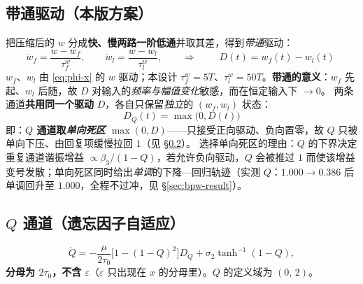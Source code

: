 \documentclass[11pt,a4paper]{article}
\theoremstyle{remark}\newtheorem{remark}{注}
\newcommand{\ath}{\operatorname{tanh}^{-1}}
\begin{document}
\subsection{带通驱动（本版方案）}\label{sec:bpw}
把压缩后的 $w$ 分成\textbf{快、慢两路一阶低通}并取其差，得到\emph{带通}驱动：
\begin{equation}
  \dot w_f=\frac{w-w_f}{\tau_f^{w}},\qquad \dot w_l=\frac{w-w_l}{\tau_l^{w}},
  \qquad\Longrightarrow\qquad
  \boxed{\;D(t)=w_f(t)-w_l(t)\;}
  \label{eq:bpw}
\end{equation}
$w_f$、$w_l$ 由 \eqref{eq:phi-x} 的 $w$ 驱动；本设计 $\tau_f^{w}=5T$、$\tau_l^{w}=50T$。\textbf{带通的意义}：$w_f$ 先起、$w_l$ 后随，故 $D$ 对输入的\emph{频率与幅值变化}敏感，而在恒定输入下 $\to0$。
两条通道\textbf{共用同一个驱动} $D$，各自只保留\emph{独立}的 $(w_f,w_l)$ 状态：
\begin{equation}
  \boxed{\;D_Q(t)=\max\bigl(0, D(t)\bigr)\;}
  \label{eq:shared-D}
\end{equation}
即：\textbf{$Q$ 通道取\emph{单向死区} $\max(0,D)$}——只接受正向驱动、负向置零，故 $Q$ 只被单向下压、由回复项缓慢拉回 $1$（见 \S\ref{sec:qch}）。
选择单向死区的理由：$Q$ 的下界决定重复通道谐振增益 $\propto\beta_3/(1-Q)$，若允许负向驱动，$Q$ 会被推过 $1$ 而使该增益变号发散；单向死区同时给出\emph{单调}的下降—回归轨迹（实测 $Q$：$1.000\to0.386$ 后单调回升至 $1.000$，全程不过冲，见 \S\ref{sec:bpw-result}）。
\subsection{$Q$ 通道（遗忘因子自适应）}\label{sec:qch}
\begin{equation}
  \dot Q=-\frac{\mu}{2\tau_0}\bigl[1-(1-Q)^2\bigr]D_Q+\sigma_2\ath(1-Q),
  \label{eq:Q}
\end{equation}
\textbf{分母为 $2\tau_0$，不含 $\varepsilon$}（$\varepsilon$ 只出现在 $x$ 的分母里）。$Q$ 的定义域为 $(0,\,2)$。
\end{document}

